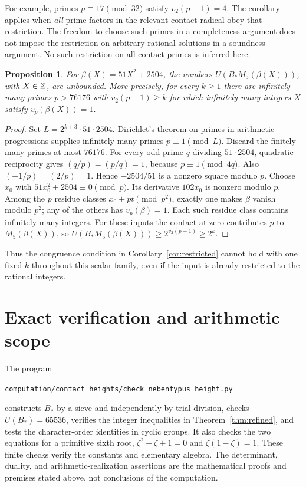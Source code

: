\documentclass[11pt,a4paper]{article}
\newtheorem{proposition}[theorem]{Proposition}
\theoremstyle{definition}\newtheorem{remark}[theorem]{Remark}
\begin{document}
For example, primes $p\equiv17\pmod{32}$ satisfy $v_2(p-1)=4$.
The corollary applies when \emph{all} prime factors in the relevant
contact radical obey that restriction. The freedom to choose such
primes in a completeness argument does not impose the restriction on
arbitrary rational solutions in a soundness argument. No such
restriction on all contact primes is inferred here.

\begin{proposition}\label{prop:quadratic-obstruction}
For $\beta(X)=51X^2+2504$, the numbers
$U(B_*M_5(\beta(X)))$, with $X\in\mathbb Z$, are unbounded.
More precisely, for every $k\ge1$ there are infinitely many primes
$p>76176$ with $v_2(p-1)\ge k$ for which infinitely many integers
$X$ satisfy $v_p(\beta(X))=1$.
\end{proposition}
\begin{proof}
Set $L=2^{k+3}\cdot51\cdot2504$. Dirichlet's theorem on primes
in arithmetic progressions \cite[Section~1]{Kedlaya} supplies infinitely many primes
$p\equiv1\pmod L$. Discard the finitely many primes at most $76176$.
For every odd prime $q$ dividing $51\cdot2504$, quadratic
reciprocity gives $(q/p)=(p/q)=1$, because $p\equiv1\pmod{4q}$.
Also $(-1/p)=(2/p)=1$. Hence $-2504/51$ is a nonzero square
modulo $p$. Choose $x_0$ with $51x_0^2+2504\equiv0\pmod p$.
Its derivative $102x_0$ is nonzero modulo $p$.
Among the $p$ residue classes $x_0+pt\pmod{p^2}$, exactly one
makes $\beta$ vanish modulo $p^2$; any of the others has
$v_p(\beta)=1$. Each such residue class contains infinitely many
integers. For these inputs the contact at zero contributes $p$ to
$M_5(\beta(X))$, so $U(B_*M_5(\beta(X)))\ge2^{v_2(p-1)}\ge2^k$.
\end{proof}

Thus the congruence condition in Corollary~\ref{cor:restricted} cannot
hold with one fixed $k$ throughout this scalar family, even if the
input is already restricted to the rational integers.

\section{Exact verification and arithmetic scope}

The program
\begin{center}\small
\nolinkurl{computation/contact_heights/check_nebentypus_height.py}
\end{center}
constructs $B_*$ by a sieve and independently by trial division,
checks $U(B_*)=65536$, verifies the integer inequalities in
Theorem~\ref{thm:refined}, and tests the character-order identities in
cyclic groups. It also checks the two equations for a primitive sixth
root, $\zeta^2-\zeta+1=0$ and $\zeta(1-\zeta)=1$.
These finite checks verify the constants and elementary algebra.
The determinant, duality, and arithmetic-realization assertions are
the mathematical proofs and premises stated above, not conclusions
of the computation.
\end{document}
